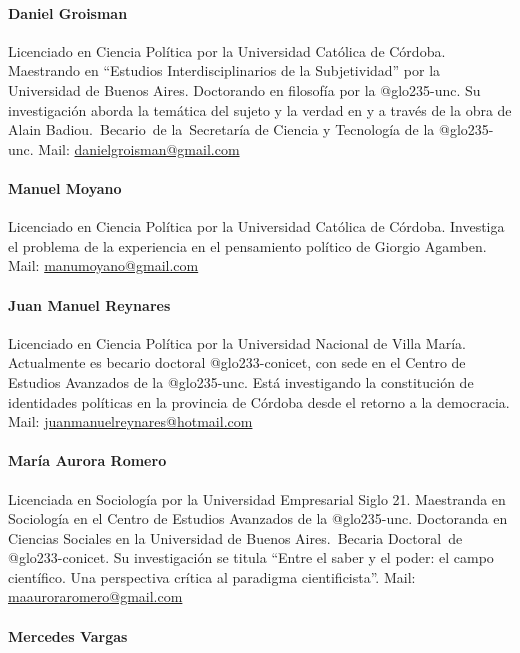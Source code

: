 \paragraph{Daniel Groisman}

Licenciado en Ciencia Política por la Universidad Católica de Córdoba. Maestrando en \enquote{Estudios Interdisciplinarios de la Subjetividad} por la Universidad de Buenos Aires. Doctorando en filosofía por la \gls{@glo235-unc}. Su investigación aborda la temática del sujeto y la verdad en y a través de la obra de Alain Badiou.~Becario~de la~Secretaría de Ciencia y Tecnología de la \gls{@glo235-unc}. Mail: \url{danielgroisman@gmail.com}

\paragraph{Manuel Moyano}

Licenciado en Ciencia Política por la Universidad Católica de Córdoba. Investiga el problema de la experiencia en el pensamiento político de Giorgio Agamben. Mail: \url{manumoyano@gmail.com}

\paragraph{Juan Manuel Reynares}

Licenciado en Ciencia Política por la Universidad Nacional de Villa María. Actualmente es becario doctoral \gls{@glo233-conicet}, con sede en el Centro de Estudios Avanzados de la \gls{@glo235-unc}. Está investigando la constitución de identidades políticas en la provincia de Córdoba desde el retorno a la democracia. Mail: \url{juanmanuelreynares@hotmail.com}

\paragraph{María Aurora Romero}

Licenciada en Sociología por la Universidad Empresarial Siglo 21. Maestranda en Sociología en el Centro de Estudios Avanzados de la \gls{@glo235-unc}. Doctoranda en Ciencias Sociales en la Universidad de Buenos Aires.~Becaria Doctoral~de \gls{@glo233-conicet}. Su investigación se titula \enquote{Entre el saber y el poder: el campo científico. Una perspectiva crítica al paradigma cientificista}. Mail: \url{maauroraromero@gmail.com}

\paragraph{Mercedes Vargas}

